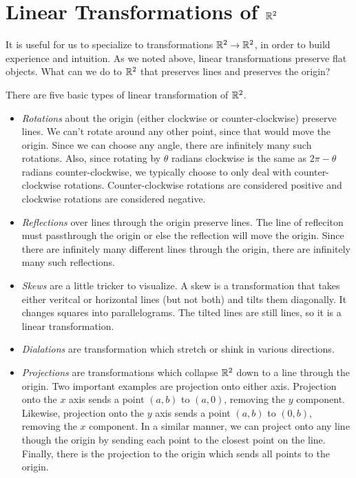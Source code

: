 \documentclass[fleqn]{report}
\begin{document}
\section{Linear Transformations of $\mathbb{R}^2$}

It is useful for us to specialize to transformations $\mathbb{R}^2
\rightarrow \mathbb{R}^2$, in order to build experience and intuition.
As we noted above, linear transformations preserve flat
objects. What can we do to $\mathbb{R}^2$ that preserves lines and
preserves the origin?  

\begin{prop}
There are five basic types of linear transformation of $\mathbb{R}^2$.
\end{prop}

\begin{itemize}
\item \emph{Rotations} about the origin (either clockwise or
counter-clockwise) preserve lines. We can't rotate around any
other point, since that would move the origin. Since we can
choose any angle, there are infinitely many such rotations.
Also, since rotating by $\theta$ radians clockwise is the same
as $2\pi - \theta$ radians counter-clockwise, we typically
choose to only deal with counter-clockwise rotations.
Counter-clockwise rotations are considered positive and
clockwise rotations are considered negative.
\item \emph{Reflections} over lines through the origin 
preserve lines. The line of refleciton must passthrough the
origin or else the reflection will move the origin. Since
there are infinitely many different lines through the origin,
there are infinitely many such reflections.
\item \emph{Skews} are a little tricker to visualize. A skew
is a transformation that takes either veritcal or horizontal
lines (but not both) and tilts them diagonally. It changes
squares into parallelograms. The tilted lines are still
lines, so it is a linear transformation.
\item \emph{Dialations} are transformation which stretch or
shink in various directions. 
\item \emph{Projections} are transformations which collapse
$\mathbb{R}^2$ down to a line through the origin. Two important
examples are projection onto either axis. Projection onto the
$x$ axis sends a point $(a,b)$ to $(a,0)$, removing the $y$
component. Likewise, projection onto the $y$ axis sends a point
$(a,b)$ to $(0,b)$, removing the $x$ component. In a similar
manner, we can project onto any line though the origin by
sending each point to the closest point on the line. Finally,
there is the projection to the origin which sends all points to
the origin.
\end{itemize}
\end{document}
